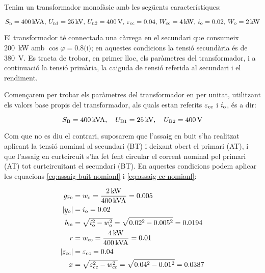 \begin{exemple}\label{ex:ParamTrafo}
	\addcontentsxms{\ParamTrafo}
    Tenim un transformador monofàsic amb les següents característiques:

    \[S_\mathrm{n}=\qty{400}{kVA},\,U_\mathrm{n1}=\qty{25}{kV},\, U_\mathrm{n2}=\qty{400}{V},\, \varepsilon_\mathrm{cc}=\num{0,04},\, W_\mathrm{cc}=\qty{4}{kW},\, i_\mathrm{o}=\num{0,02},\,  W_\mathrm{o}=\qty{2}{kW}\]

     El transformador té connectada una càrrega en el secundari que consumeix \qty{200}{kW} amb $\cos{\varphi}=\num{0,8}\text{(i)}$; en aquestes condicions la tensió secundària és de \qty{380}{V}.
    Es tracta de trobar, en primer lloc, els paràmetres del transformador, i a continuació la tensió primària, la caiguda de tensió referida al secundari i el rendiment.

    Començarem per trobar els paràmetres del transformador en per unitat, utilitzant els valors base propis del transformador, als quals estan referits $\varepsilon_\mathrm{cc}$ i $i_\mathrm{o}$, és a dir:

    \[ S_\mathrm{B}=\qty{400}{kVA},\quad U_\mathrm{B1}=\qty{25}{kV},\quad U_\mathrm{B2}=\qty{400}{V}\]

    Com que no es diu el contrari, suposarem que l'assaig en buit s'ha realitzat aplicant la tensió nominal al secundari (BT) i deixant obert el primari (AT), i que l'assaig en curtcircuit s'ha fet fent circular el corrent nominal pel primari (AT) tot curtcircuitant el secundari (BT). En aquestes condicions podem aplicar les equacions \eqref{eq:assaig-buit-nomianl} i \eqref{eq:assaig-cc-nomianl}:

   \begin{align*}
        g\ped{Fe} &= w\ped{o} = \frac{\qty{2}{kW}}{\qty{400}{kVA}} = \num{0,005} \\
        |\cmplx{y}\ped{o}| &= i\ped{o}  = \num{0,02} \\
        b\ped{m} &= \sqrt{i\ped{o}^2 - w\ped{o}^2} = \sqrt{\num{0,02}^2 - \num{0,005}^2} = \num{0,0194}\\
        r &= w\ped{cc} = \frac{\qty{4}{kW}}{\qty{400}{kVA}} = \num{0,01} \\
        |\cmplx{z}\ped{cc}| &=  \varepsilon\ped{cc} = \num{0,04} \\
        x &= \sqrt{\varepsilon\ped{cc}^2 - w\ped{cc}^2} = \sqrt{\num{0,04}^2-\num{0,01}^2} = \num{0,0387}
  \end{align*}


\end{exemple}
